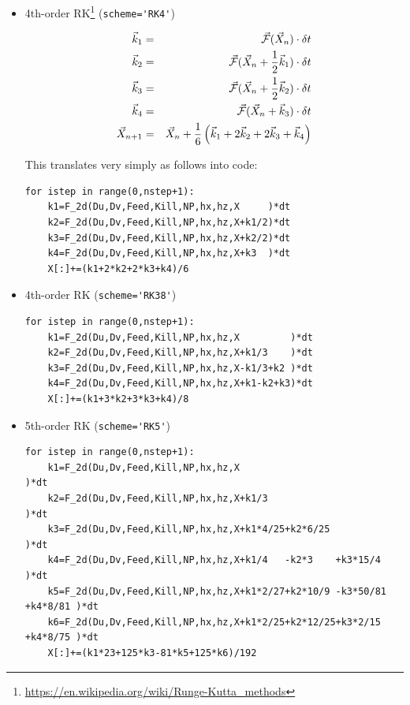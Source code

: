 \begin{itemize}
\item 4th-order RK\footnote{\url{https://en.wikipedia.org/wiki/Runge-Kutta_methods}}
(\lstinline{scheme='RK4'})

\begin{eqnarray}
\vec{k}_1 &=& \vec{\cal F}(\vec{X}_n) \cdot \delta t\nonumber\\
\vec{k}_2 &=& \vec{\cal F}(\vec{X}_n+ \frac12\vec{k}_1) \cdot \delta t \nonumber\\
\vec{k}_3 &=& \vec{\cal F}(\vec{X}_n+ \frac12\vec{k}_2) \cdot \delta t \nonumber\\
\vec{k}_4 &=& \vec{\cal F}(\vec{X}_n+ \vec{k}_3)    \cdot \delta t \nonumber \\
\vec{X}_{n+1} &=& \vec{X}_n + \frac{1}{6}\left(\vec{k}_1 + 2\vec{k}_2 + 2\vec{k}_3 + \vec{k}_4\right)
\end{eqnarray}

This translates very simply as follows into code:
\begin{lstlisting}
for istep in range(0,nstep+1):
    k1=F_2d(Du,Dv,Feed,Kill,NP,hx,hz,X     )*dt
    k2=F_2d(Du,Dv,Feed,Kill,NP,hx,hz,X+k1/2)*dt
    k3=F_2d(Du,Dv,Feed,Kill,NP,hx,hz,X+k2/2)*dt
    k4=F_2d(Du,Dv,Feed,Kill,NP,hx,hz,X+k3  )*dt
    X[:]+=(k1+2*k2+2*k3+k4)/6
\end{lstlisting}

\item 4th-order RK (\lstinline{scheme='RK38'})

\begin{lstlisting}
for istep in range(0,nstep+1):
    k1=F_2d(Du,Dv,Feed,Kill,NP,hx,hz,X         )*dt
    k2=F_2d(Du,Dv,Feed,Kill,NP,hx,hz,X+k1/3    )*dt
    k3=F_2d(Du,Dv,Feed,Kill,NP,hx,hz,X-k1/3+k2 )*dt
    k4=F_2d(Du,Dv,Feed,Kill,NP,hx,hz,X+k1-k2+k3)*dt
    X[:]+=(k1+3*k2+3*k3+k4)/8
\end{lstlisting}

\item 5th-order RK (\lstinline{scheme='RK5'})

\begin{lstlisting}
for istep in range(0,nstep+1):
    k1=F_2d(Du,Dv,Feed,Kill,NP,hx,hz,X                                    )*dt
    k2=F_2d(Du,Dv,Feed,Kill,NP,hx,hz,X+k1/3                               )*dt
    k3=F_2d(Du,Dv,Feed,Kill,NP,hx,hz,X+k1*4/25+k2*6/25                    )*dt
    k4=F_2d(Du,Dv,Feed,Kill,NP,hx,hz,X+k1/4   -k2*3    +k3*15/4           )*dt
    k5=F_2d(Du,Dv,Feed,Kill,NP,hx,hz,X+k1*2/27+k2*10/9 -k3*50/81 +k4*8/81 )*dt
    k6=F_2d(Du,Dv,Feed,Kill,NP,hx,hz,X+k1*2/25+k2*12/25+k3*2/15  +k4*8/75 )*dt
    X[:]+=(k1*23+125*k3-81*k5+125*k6)/192
\end{lstlisting}


\end{itemize}
